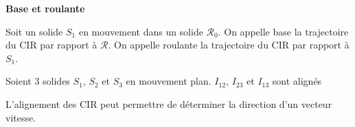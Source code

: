 \documentclass[10pt]{article}
\begin{document}
\begin{defi}
\textbf{Base et roulante}

Soit un solide $S_1$ en mouvement dans un solide $\mathcal{R}_0$. On appelle base la trajectoire du CIR par rapport à $\mathcal{R}$. On appelle roulante la trajectoire du CIR par rapport à $S_1$.
\end{defi}

\begin{theo}
Soient 3 solides $S_1$, $S_2$ et $S_3$ en mouvement plan. $I_{12}$, $I_{23}$ et $I_{13}$ sont alignés
\end{theo}

\begin{resultat}
L'alignement des CIR peut permettre de déterminer la direction d'un vecteur vitesse.
\end{resultat}
\end{document}
